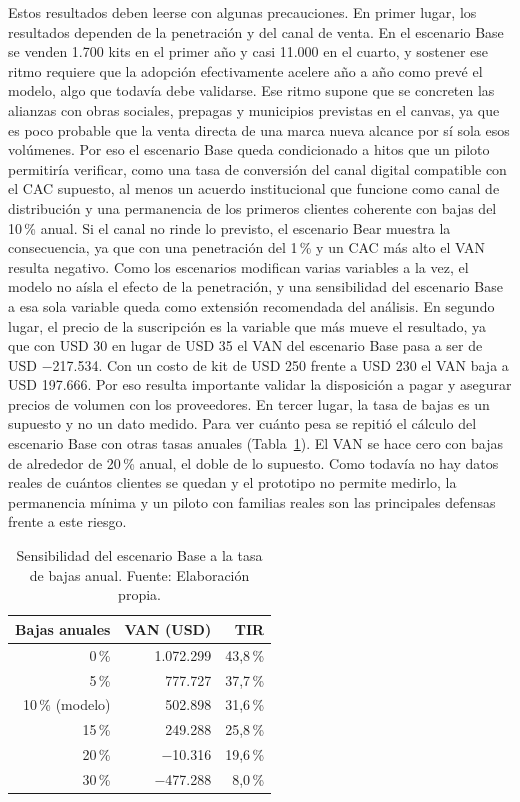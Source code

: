 
Estos resultados deben leerse con algunas precauciones.
En primer lugar, los resultados dependen de la penetración y del canal de venta.
En el escenario Base se venden 1.700 kits en el primer año y casi 11.000 en el cuarto, y sostener ese ritmo requiere que la adopción efectivamente acelere año a año como prevé el modelo, algo que todavía debe validarse.
Ese ritmo supone que se concreten las alianzas con obras sociales, prepagas y municipios previstas en el canvas, ya que es poco probable que la venta directa de una marca nueva alcance por sí sola esos volúmenes.
Por eso el escenario Base queda condicionado a hitos que un piloto permitiría verificar, como una tasa de conversión del canal digital compatible con el CAC supuesto, al menos un acuerdo institucional que funcione como canal de distribución y una permanencia de los primeros clientes coherente con bajas del 10\,\% anual.
Si el canal no rinde lo previsto, el escenario Bear muestra la consecuencia, ya que con una penetración del 1\,\% y un CAC más alto el VAN resulta negativo.
Como los escenarios modifican varias variables a la vez, el modelo no aísla el efecto de la penetración, y una sensibilidad del escenario Base a esa sola variable queda como extensión recomendada del análisis.
En segundo lugar, el precio de la suscripción es la variable que más mueve el resultado, ya que con USD 30 en lugar de USD 35 el VAN del escenario Base pasa a ser de USD $-$217.534.
Con un costo de kit de USD 250 frente a USD 230 el VAN baja a USD 197.666.
Por eso resulta importante validar la disposición a pagar y asegurar precios de volumen con los proveedores.
En tercer lugar, la tasa de bajas es un supuesto y no un dato medido.
Para ver cuánto pesa se repitió el cálculo del escenario Base con otras tasas anuales (Tabla~\ref{tab:bajas}).
El VAN se hace cero con bajas de alrededor de 20\,\% anual, el doble de lo supuesto.
Como todavía no hay datos reales de cuántos clientes se quedan y el prototipo no permite medirlo, la permanencia mínima y un piloto con familias reales son las principales defensas frente a este riesgo.

\begin{table}[H]
\centering
\caption[Sensibilidad del escenario Base a la tasa de bajas anual.]{Sensibilidad del escenario Base a la tasa de bajas anual. Fuente: Elaboración propia.}
\label{tab:bajas}
\begin{tabular}{|r|r|r|}
\hline
\textbf{Bajas anuales} & \textbf{VAN (USD)} & \textbf{TIR} \\
\hline
0\,\% & 1.072.299 & 43,8\,\% \\
\hline
5\,\% & 777.727 & 37,7\,\% \\
\hline
10\,\% (modelo) & 502.898 & 31,6\,\% \\
\hline
15\,\% & 249.288 & 25,8\,\% \\
\hline
20\,\% & $-$10.316 & 19,6\,\% \\
\hline
30\,\% & $-$477.288 & 8,0\,\% \\
\hline
\end{tabular}
\end{table}

